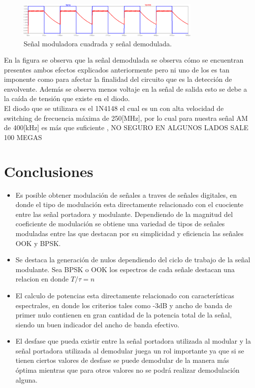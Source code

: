 \documentclass[letterpaper, titlepage]{article}
\begin{document}
		\begin{figure}[H]
			\centering
				\includegraphics[width=0.8\textwidth]{graficodemod}
			\caption{Señal moduladora cuadrada y señal demodulada.}
			\label{fig:ejemplo}
		\end{figure}

		En la figura se observa  que la señal demodulada  se observa cómo se encuentran presentes ambos efectos explicados anteriormente pero ni uno de los es tan imponente como para afectar la finalidad del circuito que es la detección de envolvente. Además se observa menos voltaje en la señal de salida esto se debe a la caída de tensión que existe en el diodo.\\
		
		El diodo que se utilizara es el 1N4148 el cual es un con alta velocidad de switching de frecuencia máxima de 250[MHz], por lo cual para nuestra señal AM de 400[kHz] es más que suficiente , NO SEGURO EN ALGUNOS LADOS SALE 100 MEGAS   

\newpage



\section{Conclusiones}
	\begin{itemize}
		\item Es posible obtener modulación de señales a traves de señales digitales, en donde el tipo de modulación esta directamente relacionado con el cuociente entre las señal portadora y modulante. Dependiendo de la magnitud del coeficiente de modulación se obtiene una variedad de tipos de señales moduladas entre las que destacan por su simplicidad y eficiencia las señales OOK y BPSK.
		\item Se destaca la generación de nulos dependiendo del ciclo de trabajo de la señal modulante. Sea BPSK o OOK los espectros de cada señale destacan una relacion en donde $T/\tau=n$
		\item El calculo de potencias esta directamente relacionado con características espectrales, en donde los criterios tales como -3dB y ancho de banda de primer nulo contienen en gran cantidad de la potencia total de la señal, siendo un buen indicador del ancho de banda efectivo.
		\item El desfase que pueda existir entre la señal portadora utilizada al modular y la señal portadora utilizada al demodular juega un rol importante ya que si se tienen ciertos valores de desfase se puede demodular de la manera más óptima mientras que para otros valores no se podrá realizar demodulación alguna.
	\end{itemize}
\end{document}
